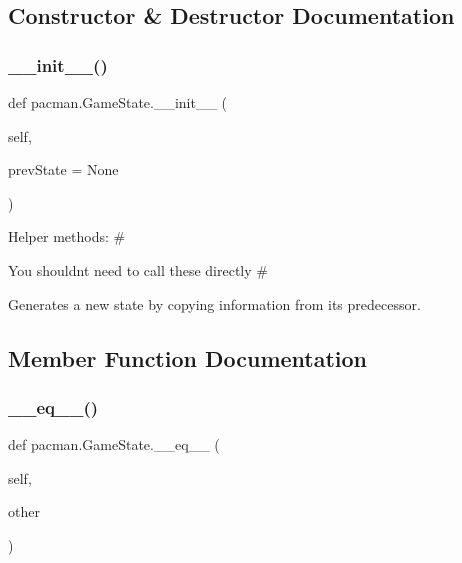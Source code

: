 \subsection{Constructor \& Destructor Documentation}
\mbox{\label{classpacman_1_1_game_state_ab9cd0448f581a626b6fa2f05a5331ca1}} 
\subsubsection{\texorpdfstring{\+\_\+\+\_\+init\+\_\+\+\_\+()}{\_\_init\_\_()}}
{\footnotesize\ttfamily def pacman.\+Game\+State.\+\_\+\+\_\+init\+\_\+\+\_\+ (\begin{DoxyParamCaption}\item[{}]{self,  }\item[{}]{prev\+State = {\ttfamily None} }\end{DoxyParamCaption})}



\begin{DoxyVerb}        Helper methods:               #
\end{DoxyVerb}
 You shouldn\textquotesingle{}t need to call these directly \# 

\begin{DoxyVerb}Generates a new state by copying information from its predecessor.
\end{DoxyVerb}
 

\subsection{Member Function Documentation}
\mbox{\label{classpacman_1_1_game_state_a9a4c4fa4c3744ec2cf1ca3afd232d089}} 
\subsubsection{\texorpdfstring{\+\_\+\+\_\+eq\+\_\+\+\_\+()}{\_\_eq\_\_()}}
{\footnotesize\ttfamily def pacman.\+Game\+State.\+\_\+\+\_\+eq\+\_\+\+\_\+ (\begin{DoxyParamCaption}\item[{}]{self,  }\item[{}]{other }\end{DoxyParamCaption})}

